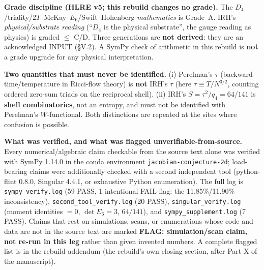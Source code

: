\documentclass[11pt,a4paper]{article}
\begin{document}
\textbf{Grade discipline (HLRE v5; this rebuild changes no grade).} The $D_4$/triality/$2T$--McKay--$E_6$/Swift--Hohenberg \emph{mathematics} is Grade~A. IRH's \emph{physical/substrate reading} (``$D_4$ is the physical substrate'', the gauge reading as physics) is graded $\leq$ C/D. Three generations are \textbf{not derived}: they are an acknowledged INPUT (\S V.2). A SymPy check of arithmetic in this rebuild is \textbf{not} a grade upgrade for any physical interpretation.

\textbf{Two quantities that must never be identified.} (i) Perelman's $\tau$ (backward time/temperature in Ricci-flow theory) is \textbf{not} IRH's $\tau$ (here $\tau \equiv T/N^{3/2}$, counting ordered zero-sum triads on the reciprocal shell). (ii) IRH's $S = \tau^2/q_4 = 64/141$ is \textbf{shell combinatorics}, not an entropy, and must not be identified with Perelman's $W$-functional. Both distinctions are repeated at the sites where confusion is possible.

\textbf{What was verified, and what was flagged unverifiable-from-source.} Every numerical/algebraic claim checkable from the source text alone was verified with SymPy 1.14.0 in the conda environment \texttt{jacobian-conjecture-2d}; load-bearing claims were additionally checked with a second independent tool (python-flint 0.8.0, Singular 4.4.1, or exhaustive Python enumeration). The full log is \texttt{sympy\_verify.log} (59 PASS, 1 intentional FAIL-flag: the 11.85\%/11.90\% inconsistency), \texttt{second\_tool\_verify.log} (20 PASS), \texttt{singular\_verify.log} (moment identities $= 0$, $\det E_6 = 3$, $64/141$), and \texttt{sympy\_supplement.log} (7 PASS). Claims that rest on simulations, scans, or enumerations whose code and data are not in the source text are marked \textbf{FLAG: simulation/scan claim, not re-run in this leg} rather than given invented numbers. A complete flagged list is in the rebuild addendum (the rebuild's own closing section, after Part X of the manuscript).
\end{document}
